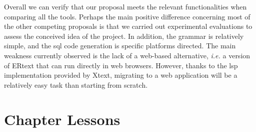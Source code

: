 Overall we can verify that our proposal meets the relevant functionalities when comparing all the tools.
Perhaps the main positive difference concerning most of the other competing proposals is that we carried out experimental evaluations to assess the conceived idea of the project. In addition, the grammar is relatively simple, and the \ac{sql} code generation is specific platforms directed.
The main weakness currently observed is the lack of a web-based alternative, \textit{i.e.} a version of ERtext that can run directly in web browsers.
However, thanks to the \ac{lsp} implementation provided by Xtext, migrating to a web application will be a relatively easy task than starting from scratch.

\section{Chapter Lessons} \label{sec_slm:lessons}

